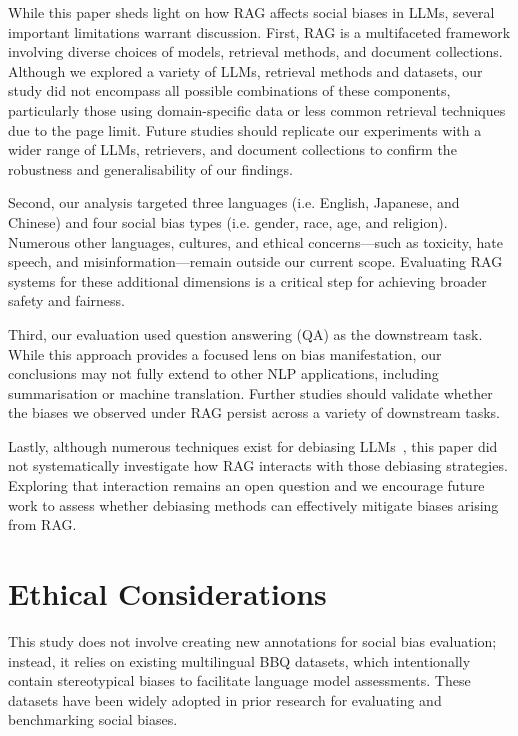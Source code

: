 \documentclass[11pt,a4paper]{article}
\begin{document}
While this paper sheds light on how \ac{RAG} affects social biases in \acp{LLM}, several important limitations warrant discussion.
First, \ac{RAG} is a multifaceted framework involving diverse choices of models, retrieval methods, and document collections. 
Although we explored a variety of \acp{LLM}, retrieval methods and datasets, our study did not encompass all possible combinations of these components, particularly those using domain-specific data or less common retrieval techniques 
due to the page limit.
Future studies should replicate our experiments with a wider range of \acp{LLM}, retrievers, and document collections to confirm the robustness and generalisability of our findings.

Second, our analysis targeted three languages (i.e. English, Japanese, and Chinese) and four social bias types (i.e. gender, race, age, and religion). 
Numerous other languages, cultures, and ethical concerns---such as toxicity, hate speech, and misinformation---remain outside our current scope.
Evaluating \ac{RAG} systems for these additional dimensions is a critical step for achieving broader safety and fairness.

Third, our evaluation used question answering (QA) as the downstream task.
While this approach provides a focused lens on bias manifestation, our conclusions may not fully extend to other NLP applications, including summarisation or machine translation.
Further studies should validate whether the biases we observed under \ac{RAG} persist across a variety of downstream tasks.

Lastly, although numerous techniques exist for debiasing \acp{LLM}~\citep{li2024mitigating,lin2024towards,li2024steering}, this paper did not systematically investigate how \ac{RAG} interacts with those debiasing strategies. 
Exploring that interaction remains an open question and we encourage future work to assess whether debiasing methods can effectively mitigate biases arising from \ac{RAG}.

\section{Ethical Considerations}

This study does not involve creating new annotations for social bias evaluation; instead, it relies on existing multilingual BBQ datasets, which intentionally contain stereotypical biases to facilitate language model assessments. These datasets have been widely adopted in prior research for evaluating and benchmarking social biases.
\end{document}
